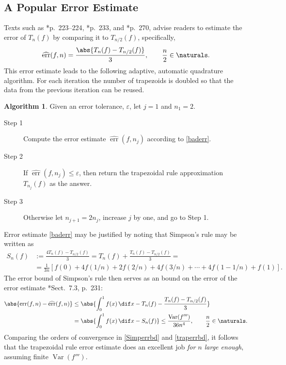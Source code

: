 \documentclass[]{amsart}
\DeclareMathOperator{\Var}{Var}
\DeclareMathOperator{\err}{err}
\newcommand{\herr}{\widehat{\err}}
\theoremstyle{definition}
\newtheorem{algo}{Algorithm}
\theoremstyle{remark}
\begin{document}
\subsection{A Popular Error Estimate}
Texts such as *{p.\ 223--224}, *{p.\ 233}, and  *{p.\ 270}, advise readers to estimate the error of $T_n(f)$ by comparing it to $T_{n/2}(f)$, specifically,
\begin{equation}\label{baderr}
\herr(f,n) = \frac{\abs{T_n(f) - T_{n/2}(f)}}{3}, \qquad \frac n2 \in \naturals.
\end{equation}
This error estimate leads to the following adaptive, automatic  quadrature algorithm. For each iteration the number of trapezoids is doubled so that the data from the previous iteration can be reused. 

\begin{algo} \label{baderralgo} Given an error tolerance, $\varepsilon$, let $j=1$ and $n_1=2$.

\begin{description} 

\item[Step 1] Compute the error estimate $\herr(f,n_j)$ according to \eqref{baderr}.

\item [Step 2] If $\herr(f,n_j) \le \varepsilon$, then return the trapezoidal rule approximation $T_{n_j}(f)$ as the answer.  

\item [Step 3] Otherwise let $n_{j+1}=2 n_j$, increase $j$ by one, and go to Step 1.

\end{description}

\end{algo}

Error estimate \ref{baderr} may be justified by noting that Simpson's rule may be written as 
\begin{align*}
S_n(f) &:= \frac{4T_n(f) - T_{n/2}(f)}{3} =  T_n(f) + \frac{T_n(f) - T_{n/2}(f)}{3}= \\
& = \frac{1}{3n} \left [ f(0) + 4 f(1/n) + 2 f(2/n) + 4 f(3/n) + \cdots + 4 f(1-1/n) + f(1) \right].
\end{align*}
The error bound of Simpson's rule then serves as an bound on the error of the error estimate \cite{BraPet11a}*{Sect.\ 7.3, p.\ 231}:
\begin{align} \label{Simperrbd}
\abs{\err(f,n) - \herr(f,n)} & \le \abs{\int_0^1 f(x) \, \dif x - T_n(f) - \frac{T_n(f) - T_{n/2}(f)}{3}} \\
\nonumber
& = \abs{\int_0^1 f(x) \, \dif x - S_n(f)}  \le \frac{\Var(f''')}{36n^4}, \qquad \frac{n}2 \in \naturals. 
\end{align}
Comparing the orders of convergence in \eqref{Simperrbd} and \eqref{traperrbd}, it follows that the trapezoidal rule error estimate does an excellent job \emph{for $n$ large enough}, assuming finite $\Var(f''')$.
\end{document}
